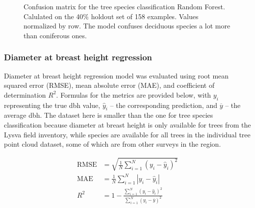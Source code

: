 \begin{figure}
\caption[Confusion matrix for the tree species classification Random Forest.]{\label{fig-clf-confusion-matrix}Confusion matrix for the tree
species classification Random Forest. Calulated on the 40\% holdout set
of 158 examples. Values normalized by row. The model confuses deciduous
species a lot more than coniferous ones.}
\end{figure}

\subsubsection{Diameter at breast height regression}

Diameter at breast height regression model was evaluated using root mean squared error (RMSE), mean absolute error (MAE), and coefficient of determination $R^2$.
Formulas for the metrics are provided below, with $y_i$ representing the true dbh value, $\hat y_i$ – the corresponding prediction, and $\overline y$ – the average dbh.
The dataset here is smaller than the one for tree species classification because diameter at breast height is only available for trees from the Lysva field inventory, while species are available for all trees in the individual tree point cloud dataset, some of which are from other surveys in the region.

$$
\begin{aligned}
\text{RMSE} &= \sqrt{\frac{1}{N} \sum_{i=1}^N (y_i - \hat y_i)^2} \\
\text{MAE} &= \frac{1}{N} \sum_{i=1}^N | y_i - \hat y_i | \\
R^2 &= 1 - \frac{\sum_{i=1}^N (y_i - \hat y_i)^2}{\sum_{i=1}^N (y_i - \overline y)^2}
\end{aligned}
$$


